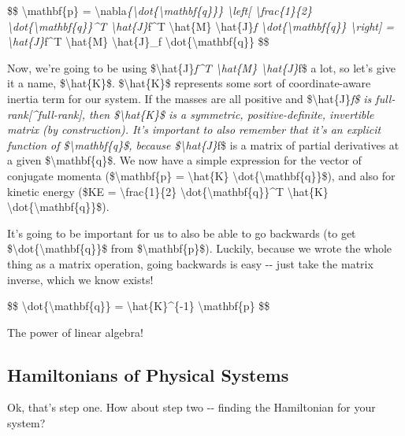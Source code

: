 \documentclass[]{article}
\begin{document}
\$\$ \textbackslash{}mathbf\{p\} =
\textbackslash{}nabla\emph{\{\textbackslash{}dot\{\textbackslash{}mathbf\{q\}\}\}
\textbackslash{}left{[} \textbackslash{}frac\{1\}\{2\}
\textbackslash{}dot\{\textbackslash{}mathbf\{q\}\}\^{}T
\textbackslash{}hat\{J\}}f\^{}T \textbackslash{}hat\{M\}
\textbackslash{}hat\{J\}\emph{f
\textbackslash{}dot\{\textbackslash{}mathbf\{q\}\} \textbackslash{}right{]} =
\textbackslash{}hat\{J\}}f\^{}T \textbackslash{}hat\{M\}
\textbackslash{}hat\{J\}\_f \textbackslash{}dot\{\textbackslash{}mathbf\{q\}\}
\$\$

Now, we're going to be using \$\textbackslash{}hat\{J\}\emph{f\^{}T
\textbackslash{}hat\{M\} \textbackslash{}hat\{J\}}f\$ a lot, so let's give it a
name, \$\textbackslash{}hat\{K\}\$. \$\textbackslash{}hat\{K\}\$ represents some
sort of coordinate-aware inertia term for our system. If the masses are all
positive and \$\textbackslash{}hat\{J\}\emph{f\$ is
full-rank{[}\^{}full-rank{]}, then \$\textbackslash{}hat\{K\}\$ is a symmetric,
positive-definite, invertible matrix (by construction). It's important to also
remember that it's an explicit function of \$\textbackslash{}mathbf\{q\}\$,
because \$\textbackslash{}hat\{J\}}f\$ is a matrix of partial derivatives at a
given \$\textbackslash{}mathbf\{q\}\$. We now have a simple expression for the
vector of conjugate momenta (\$\textbackslash{}mathbf\{p\} =
\textbackslash{}hat\{K\} \textbackslash{}dot\{\textbackslash{}mathbf\{q\}\}\$),
and also for kinetic energy (\$KE = \textbackslash{}frac\{1\}\{2\}
\textbackslash{}dot\{\textbackslash{}mathbf\{q\}\}\^{}T \textbackslash{}hat\{K\}
\textbackslash{}dot\{\textbackslash{}mathbf\{q\}\}\$).

It's going to be important for us to also be able to go backwards (to get
\$\textbackslash{}dot\{\textbackslash{}mathbf\{q\}\}\$ from
\$\textbackslash{}mathbf\{p\}\$). Luckily, because we wrote the whole thing as a
matrix operation, going backwards is easy -\/- just take the matrix inverse,
which we know exists!

\$\$ \textbackslash{}dot\{\textbackslash{}mathbf\{q\}\} =
\textbackslash{}hat\{K\}\^{}\{-1\} \textbackslash{}mathbf\{p\} \$\$

The power of linear algebra!

\subsection{Hamiltonians of Physical Systems}

Ok, that's step one. How about step two -\/- finding the Hamiltonian for your
system?
\end{document}
